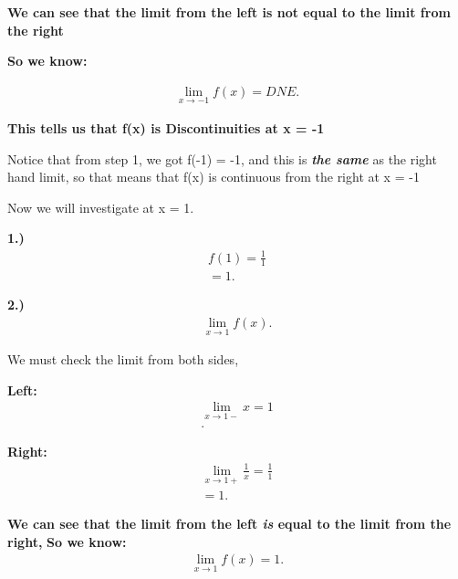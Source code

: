 \documentclass{report}
\begin{document}
        \bigbreak \noindent 
        \textbf{We can see that the limit from the left is not equal to the limit
            from the right
        }

        \bigbreak \noindent 
        \textbf{So we know:}

        \begin{align*}
            \lim\limits_{x \to -1}{f \left(x\right) = DNE}
        .\end{align*}

        \bigbreak \noindent 
        \textbf{This tells us that f(x) is Discontinuities at x = -1}

        \bigbreak \noindent 
        Notice that from step 1, we got f(-1) = -1, and this is \textbf{\textit{the same}} 
        as the right hand limit, so that means that f(x) is continuous from the right at x = -1 

        \pagebreak
        \bigbreak \noindent 
        Now we will investigate at x = 1.

        \bigbreak \noindent 
        \textbf{1.)}
        \begin{align*}
            f \left(1\right) = \frac{1}{1} \\ 
            = 1
        .\end{align*}

        \bigbreak \noindent 
        \textbf{2.)} 
        \begin{align*}
            \lim\limits_{x \to 1}{f \left(x\right)}
        .\end{align*}

        \bigbreak \noindent 
        We must check the limit from both sides, 

        \bigbreak \noindent 
        \textbf{Left:}
        \begin{align*}
            \lim\limits_{x \to 1-}{x} = 1 \\ 
        .\end{align*}

        \bigbreak \noindent 
        \textbf{Right:}
        \begin{align*}
            \lim\limits_{x \to 1+}{ \frac{1}{x}} = \frac{1}{1} \\ 
            =  1
        .\end{align*}

        \bigbreak \noindent 
        \textbf{We can see that the limit from the left \textbf{\textit{is}} equal to the limit 
            from the right, 
        }
        \textbf{So we know:}
        \begin{align*}
            \lim\limits_{x \to 1}{f \left(x\right)} = 1
        .\end{align*}
\end{document}
